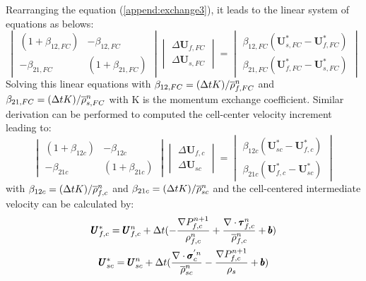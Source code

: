 \documentclass[preprint,12pt]{elsarticle}
\begin{document}
%
%
Rearranging the equation (\ref{append:exchange3}), it leads to the linear system of equations as belows:
%
\[ \begin{vmatrix} (1 + \beta_{12,FC})  &  -\beta_{12,FC} \\
                  -\beta_{21,FC}       &  (1 + \beta_{21,FC})
    \end {vmatrix}
    \begin{vmatrix} \Delta \pmb{U}_{f,FC} \\
                    \Delta \pmb{U}_{s,FC}
    \end {vmatrix}
    =
    \begin{vmatrix}  \beta_{12,FC}(\pmb{U}_{s,FC}^{*} - \pmb{U}_{f,FC}^{*}) \\
                    \beta_{21,FC}(\pmb{U}_{f,FC}^{*} - \pmb{U}_{s,FC}^{*})
    \end {vmatrix}                
\]
%
%
Solving this linear equations with $\beta_{12,FC} = (\Delta{t} K)/\overline{\rho}_{f,FC}^n$ and $\beta_{21,FC} = (\Delta{t} K)/\overline{\rho}_{s,FC}^n$ with K is the momentum exchange coefficient. Similar derivation can be performed to computed the cell-center velocity increment leading to:
%
\[ \begin{vmatrix} (1 + \beta_{12c})  &  -\beta_{12c} \\
                  -\beta_{21c}       &  (1 + \beta_{21c})
    \end {vmatrix}
    \begin{vmatrix} \Delta \pmb{U}_{f,c} \\
                    \Delta \pmb{U}_{sc}
    \end {vmatrix}
    =
    \begin{vmatrix}  \beta_{12c}(\pmb{U}_{sc}^{*} - \pmb{U}_{f,c}^{*}) \\
                    \beta_{21c}(\pmb{U}_{f,c}^{*} - \pmb{U}_{sc}^{*})
    \end {vmatrix}                
\]
%
%
with $\beta_{12c} = (\Delta{t} K)/\overline{\rho}_{f,c}^n$ and $\beta_{21c} = (\Delta{t} K)/\overline{\rho}_{sc}^n$ and the cell-centered intermediate velocity can be calculated by:
%
\begin{equation}
\begin{gathered}
\pmb{U}_{f,c}^{*} = \pmb{U}_{f,c}^{n} + \Delta{t} (-\frac{\nabla P_{f,c}^{n+1}}{\rho_{f,c}^n}  + \frac {\nabla \cdot \pmb{\tau}_{f,c}^{n}}{\overline{\rho}^n_{f,c}} + \pmb{b}) \\
\pmb{U}_{sc}^{*} = \pmb{U}_{sc}^{n} + \Delta{t} (\frac{\nabla \cdot \pmb{\sigma}_c^{'n}}{\overline{\rho}^n_{sc}}    - \frac{\nabla P_{f,c}^{n+1}}{\rho_s}  + \pmb{b})
\end {gathered}
\end {equation}
\end{document}
